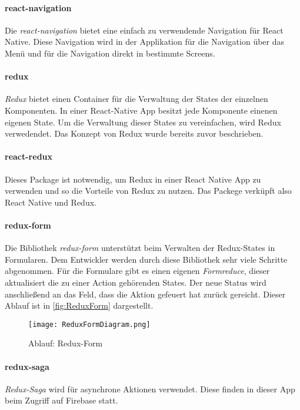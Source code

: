 \paragraph{react-navigation}
Die \textit{react-navigation} bietet eine einfach zu verwendende Navigation für React Native.
Diese Navigation wird in der Applikation für die Navigation über das Menü und für die Navigation
direkt in bestimmte Screens. \cite{ReactNavigation:online}

\paragraph{redux}
\textit{Redux} bietet einen Container für die Verwaltung der States der einzelnen Komponenten.
In einer React-Native App besitzt jede Komponente einenen eigenen State. Um die Verwaltung dieser
States zu vereinfachen, wird Redux verwedendet. Das Konzept von Redux wurde bereits zuvor beschrieben.
\cite{Redux:online}

\paragraph{react-redux}
Dieses Package ist notwendig, um Redux in einer React Native App zu verwenden und so die Vorteile von
Redux zu nutzen. Das Packege verküpft also React Native und Redux.
\cite{ReactRedux:online}

\paragraph{redux-form}
Die Bibliothek \textit{redux-form} unterstützt beim Verwalten der Redux-States in Formularen.
Dem Entwickler werden durch diese Bibliothek sehr viele Schritte abgenommen. Für die Formulare
gibt es einen eigenen \textit{Formreduce}, dieser aktualisiert die zu einer Action gehörenden States.
Der neue Status wird anschließend an das Feld, dass die Aktion gefeuert hat zurück gereicht. Dieser
Ablauf ist in \autoref{fig:ReduxForm} dargestellt. \cite{ReduxForm:online}

\begin{figure}[h]
    \centering
    \texttt{[image: ReduxFormDiagram.png]}
    \caption{Ablauf: Redux-Form}
    \label{fig:ReduxForm}
\end{figure}

\paragraph{redux-saga}
\textit{Redux-Saga} wird für asynchrone Aktionen verwendet. Diese finden in dieser
App beim Zugriff auf Firebase statt. \cite{ReduxSaga:online}

